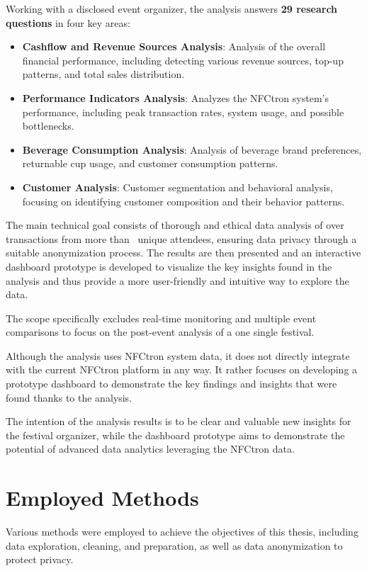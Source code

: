 Working with a disclosed event organizer, the analysis answers \textbf{29 research questions} in four key areas:\\
\begin{itemize}
	\item \textbf{Cashflow and Revenue Sources Analysis}: Analysis of the overall financial performance, including detecting various revenue sources, top-up patterns, and total sales distribution.
	\item \textbf{Performance Indicators Analysis}: Analyzes the NFCtron system's performance, including peak transaction rates, system usage, and possible bottlenecks.
	\item \textbf{Beverage Consumption Analysis}: Analysis of beverage brand preferences, returnable cup usage, and customer consumption patterns.
	\item \textbf{Customer Analysis}: Customer segmentation and behavioral analysis, focusing on identifying customer composition and their behavior patterns.
\end{itemize}

The main technical goal consists of thorough and ethical data analysis of over~ transactions from more than~ unique attendees, ensuring data privacy through a suitable anonymization process.
The results are then presented and an interactive dashboard prototype is developed to visualize the key insights found in the analysis and thus provide a more user-friendly and intuitive way to explore the data.

The scope specifically excludes real-time monitoring and multiple event comparisons to focus on the post-event analysis of a one single festival.

Although the analysis uses NFCtron system data, it does not directly integrate with the current NFCtron platform in any way.
It rather focuses on developing a prototype dashboard to demonstrate the key findings and insights that were found thanks to the analysis.

The intention of the analysis results is to be clear and valuable new insights for the festival organizer, while the dashboard prototype aims to demonstrate the potential of advanced data analytics leveraging the NFCtron data.

\section*{Employed Methods}
\label{sec:employed-methods}
Various methods were employed to achieve the objectives of this thesis, including data exploration, cleaning, and preparation, as well as data anonymization to protect privacy.

